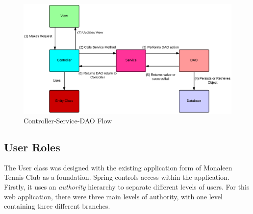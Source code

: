 \begin{figure}[H]
\begin{center}
\includegraphics[width=14cm]{csdao.png}
\end{center}
\caption{Controller-Service-DAO Flow}
\label{fig:csdao}
\end{figure}


\subsection{User Roles}

The User class was designed with the existing application form of Monaleen Tennis Club as a foundation. 
Spring controls access within the application. Firstly, it uses an \textit{authority} hierarchy to separate different levels of users. For this web application, there were three main levels of authority, with one level containing three different branches.

